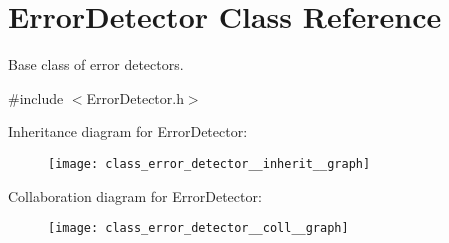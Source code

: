\hypertarget{class_error_detector}{}\section{Error\+Detector Class Reference}
\label{class_error_detector}


Base class of error detectors.  




{\ttfamily \#include $<$Error\+Detector.\+h$>$}



Inheritance diagram for Error\+Detector\+:
\nopagebreak
\begin{figure}[H]
\begin{center}
\leavevmode
\texttt{[image: class\_error\_detector\_\_inherit\_\_graph]}
\end{center}
\end{figure}


Collaboration diagram for Error\+Detector\+:
\nopagebreak
\begin{figure}[H]
\begin{center}
\leavevmode
\texttt{[image: class\_error\_detector\_\_coll\_\_graph]}
\end{center}
\end{figure}
